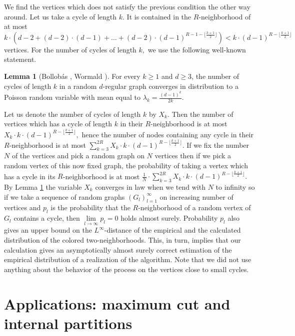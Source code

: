 \documentclass{article}
\theoremstyle{definition}
\newtheorem{lemma}[definition]{Lemma}
\begin{document}
We find the vertices which does not satisfy the previous condition the other way around. Let us take a cycle of length $k.$ It is contained in the $R$-neighborhood of at most $$k\cdot\left(d-2+(d-2)\cdot(d-1)+\dots+(d-2)\cdot(d-1)^{R-1-\lfloor\frac{k+1}{2}\rfloor}\right)<k\cdot (d-1)^{R-\lfloor\frac{k+1}{2}\rfloor}$$ vertices. For the number of cycles of length $k,$ we use the following well-known statement.
\begin{lemma}[Bollobás \cite{bollobas1980probabilistic}, Wormald \cite{wormald1999models}]
\label{lemma:BW_poisson}
For every $k\ge 1$ and $d \ge 3$, the number of cycles of length $k$ in
a random $d$-regular graph converges in distribution to a Poisson random variable with mean equal to $\lambda_k=\frac{(d-1)^k}{2k}$.
\end{lemma}

Let us denote the number of cycles of length $k$ by $X_k.$ Then the number of vertices which has a cycle of length $k$ in their $R$-neighborhood is at most $X_k\cdot k\cdot (d-1)^{R-\lfloor\frac{k+1}{2}\rfloor},$ hence the number of nodes containing any cycle in their $R$-neighborhood is at most $\sum_{k=3}^{2R}X_k\cdot k\cdot (d-1)^{R-\lfloor\frac{k+1}{2}\rfloor}.$ If we fix the number $N$ of the vertices and pick a random graph on $N$ vertices then if we pick a random vertex of this now fixed graph, the probability of taking a vertex which has a cycle in its $R$-neighborhood is at most $\frac1N\cdot \sum_{k=3}^{2R}X_k\cdot k\cdot (d-1)^{R-\lfloor\frac{k+1}{2}\rfloor}.$ By Lemma \ref{lemma:BW_poisson} the variable $X_k$ converges in law when we tend with $N$ to infinity so if we take a sequence of random graphs $(G_l)_{l=1}^\infty$ on increasing number of vertices and $p_l$ is the probability that the $R$-neighborhood of a random vertex of $G_l$ contains a cycle, then $\lim\limits_{l\to\infty}p_l=0$ holds almost surely. Probability $p_l$ also gives an upper bound on the $L^\infty$-distance of the empirical and the calculated distribution of the colored two-neighborhoods. This, in turn, implies that our calculation gives an asymptotically almost surely correct estimation of the empirical distribution of a realization of the algorithm. Note that we did not use anything about the behavior of the process on the vertices close to small cycles.

\section{Applications: maximum cut and internal partitions}\label{application}
\end{document}

